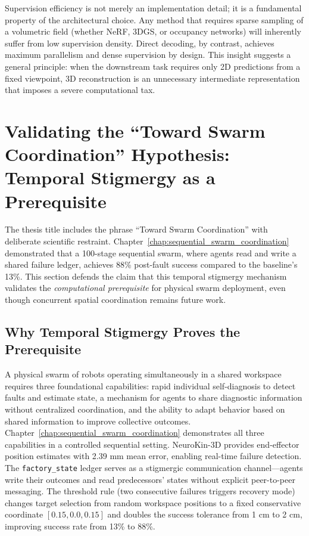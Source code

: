 \documentclass[12pt,a4paper,oneside]{report}
\begin{document}
Supervision efficiency is not merely an implementation detail; it is a fundamental property of the architectural choice. Any method that requires sparse sampling of a volumetric field (whether NeRF, 3DGS, or occupancy networks) will inherently suffer from low supervision density. Direct decoding, by contrast, achieves maximum parallelism and dense supervision by design. This insight suggests a general principle: when the downstream task requires only 2D predictions from a fixed viewpoint, 3D reconstruction is an unnecessary intermediate representation that imposes a severe computational tax.

\section{Validating the ``Toward Swarm Coordination'' Hypothesis: Temporal Stigmergy as a Prerequisite}

The thesis title includes the phrase ``Toward Swarm Coordination'' with deliberate scientific restraint. Chapter~\ref{chap:sequential_swarm_coordination} demonstrated that a 100-stage sequential swarm, where agents read and write a shared failure ledger, achieves 88\% post-fault success compared to the baseline's 13\%. This section defends the claim that this temporal stigmergy mechanism validates the \textit{computational prerequisite} for physical swarm deployment, even though concurrent spatial coordination remains future work.

\subsection{Why Temporal Stigmergy Proves the Prerequisite}
\label{subsec:why_temporal_stigmergy_proves_the_prerequisite_1_main}

A physical swarm of robots operating simultaneously in a shared workspace requires three foundational capabilities: rapid individual self-diagnosis to detect faults and estimate state, a mechanism for agents to share diagnostic information without centralized coordination, and the ability to adapt behavior based on shared information to improve collective outcomes. Chapter~\ref{chap:sequential_swarm_coordination} demonstrates all three capabilities in a controlled sequential setting. NeuroKin-3D provides end-effector position estimates with 2.39 mm mean error, enabling real-time failure detection. The \texttt{factory\_state} ledger serves as a stigmergic communication channel—agents write their outcomes and read predecessors' states without explicit peer-to-peer messaging. The threshold rule (two consecutive failures triggers recovery mode) changes target selection from random workspace positions to a fixed conservative coordinate $[0.15, 0.0, 0.15]$ and doubles the success tolerance from 1 cm to 2 cm, improving success rate from 13\% to 88\%.
\end{document}
